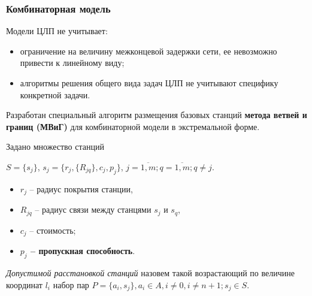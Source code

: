 \begin{frame}
    \frametitle{Комбинаторная модель}
    \justifying
    Модели ЦЛП не учитывает:
    \begin{itemize}
        \item ограничение на величину межконцевой задержки сети, ее невозможно привести к линейному виду;
        \item алгоритмы решения общего вида задач ЦЛП не учитывают специфику конкретной задачи.
    \end{itemize}
    

    \bigskip
    Разработан специальный алгоритм размещения базовых станций \textbf{метода ветвей и границ (МВиГ)} для комбинаторной модели в экстремальной форме.

    \bigskip

    Задано множество станций 
    
    $S = \{s_j\}$, $s_j = \{r_j, \{R_{jq}\}, c_j, p_j \}$, $j = \overline{1,m}; q = \overline{1,m}; q \neq j$. 
    \begin{itemize}
        \item $r_j$ -- радиус покрытия станции,
        \item $R_{jq}$ -- радиус связи между станцями $s_j$ и $s_q$,
        \item $c_j$ -- стоимость;
        \item \textbf{$p_j$ -- пропускная способность}.
    \end{itemize} 

    \bigskip
    \textit{Допустимой расстановкой станций} назовем такой возрастающий по величине координат $l_i$  набор пар $P = \{a_i, s_j\},a_i \in A,i \neq 0,i \neq n+1;s_j \in S$.

\end{frame}

